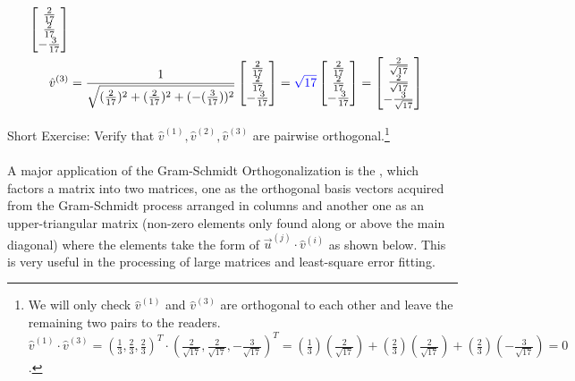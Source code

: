 \begin{solution}
\begin{align*}
\begin{bmatrix}
\frac{2}{17} \\
\frac{2}{17} \\
-\frac{3}{17}
\end{bmatrix}
\\
\hat{v}^{(3)} &= \frac{1}{\sqrt{(\frac{2}{17})^2 + (\frac{2}{17})^2 + (-(\frac{3}{17}))^2}}
\begin{bmatrix}
\frac{2}{17} \\
\frac{2}{17} \\
-\frac{3}{17}
\end{bmatrix}
=
\textcolor{blue}{\sqrt{17}}
\begin{bmatrix}
\frac{2}{17} \\
\frac{2}{17} \\
-\frac{3}{17}
\end{bmatrix}
=
\begin{bmatrix}
\frac{2}{\sqrt{17}} \\
\frac{2}{\sqrt{17}} \\
-\frac{3}{\sqrt{17}}
\end{bmatrix}
\end{align*}
\end{solution}
Short Exercise: Verify that $\hat{v}^{(1)}, \hat{v}^{(2)}, \hat{v}^{(3)}$ are pairwise orthogonal.\footnote{We will only check $\hat{v}^{(1)}$ and $\hat{v}^{(3)}$ are orthogonal to each other and leave the remaining two pairs to the readers. $\hat{v}^{(1)} \cdot \hat{v}^{(3)} = (\frac{1}{3}, \frac{2}{3}, \frac{2}{3})^T \cdot (\frac{2}{\sqrt{17}}, \frac{2}{\sqrt{17}}, -\frac{3}{\sqrt{17}})^T = (\frac{1}{3})(\frac{2}{\sqrt{17}}) + (\frac{2}{3})(\frac{2}{\sqrt{17}}) + (\frac{2}{3})(-\frac{3}{\sqrt{17}}) = 0$.} \\
\\
A major application of the Gram-Schmidt Orthogonalization is the , which factors a matrix into two matrices, one as the orthogonal basis vectors acquired from the Gram-Schmidt process arranged in columns and another one as an upper-triangular matrix (non-zero elements only found along or above the main diagonal) where the elements take the form of $\vec{u}^{(j)} \cdot \hat{v}^{(i)}$ as shown below. This is very useful in the processing of large matrices and least-square error fitting.
